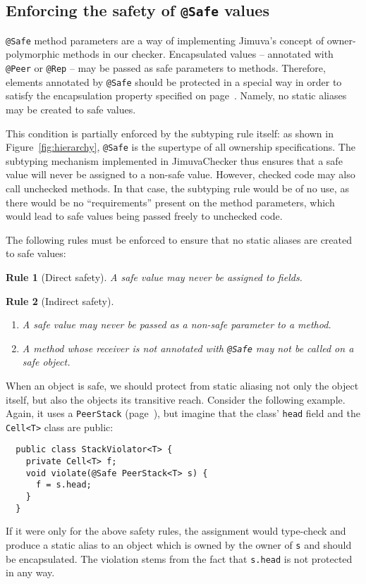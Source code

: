 \documentclass{pracamgr}
\theoremstyle{break}
\theoremstyle{break}
\theoremstyle{break}
\newtheorem{verrule}{Rule}
\begin{document}
\subsection{Enforcing the safety of \texttt{@Safe} values}
\label{sec:chk:safe}

\texttt{@Safe} method parameters are a way of implementing Jimuva's
concept of owner-polymorphic methods in our checker. Encapsulated
values -- annotated with \texttt{@Peer} or \texttt{@Rep} -- may be
passed as safe parameters to methods. Therefore, elements annotated by
\texttt{@Safe} should be protected in a special way in order to
satisfy the encapsulation property specified on
page~\pageref{inv:encap}. Namely, no static aliases may be created to
safe values.

This condition is partially enforced by the subtyping rule itself: as
shown in Figure~\ref{fig:hierarchy}, \texttt{@Safe} is the supertype
of all ownership specifications. The subtyping mechanism implemented
in JimuvaChecker thus ensures that a safe value will never be assigned
to a non-safe value. However, checked code may also call unchecked
methods. In that case, the subtyping rule would be of no use, as there
would be no ``requirements'' present on the method parameters, which
would lead to safe values being passed freely to unchecked code.

The following rules must be enforced to ensure that no static aliases
are created to safe values:

\begin{verrule}[Direct safety]
  A safe value may never be assigned to fields. 
\end{verrule}
\vspace{-1cm}
\begin{verrule}[Indirect safety]
  \begin{enumerate}[label=(\arabic*)]
  \item A safe value may never be passed as a non-safe parameter to a
    method.
  \item A method whose receiver is not annotated with \texttt{@Safe}
    may not be called on a safe object.
  \end{enumerate}
\end{verrule}

When an object is safe, we should protect from static aliasing not
only the object itself, but also the objects its transitive reach.
Consider the following example. Again, it uses a \texttt{PeerStack}
(page~\pageref{lst:stack-peer}), but imagine that the class'
\texttt{head} field and the \texttt{Cell<T>} class are public:
\begin{lstlisting}
  public class StackViolator<T> {
    private Cell<T> f;
    void violate(@Safe PeerStack<T> s) {
      f = s.head;
    }
  }
\end{lstlisting}
If it were only for the above safety rules, the assignment would
type-check and produce a static alias to an object which is owned by
the owner of \texttt{s} and should be encapsulated. The violation
stems from the fact that \texttt{s.head} is not protected in any way.
\end{document}
